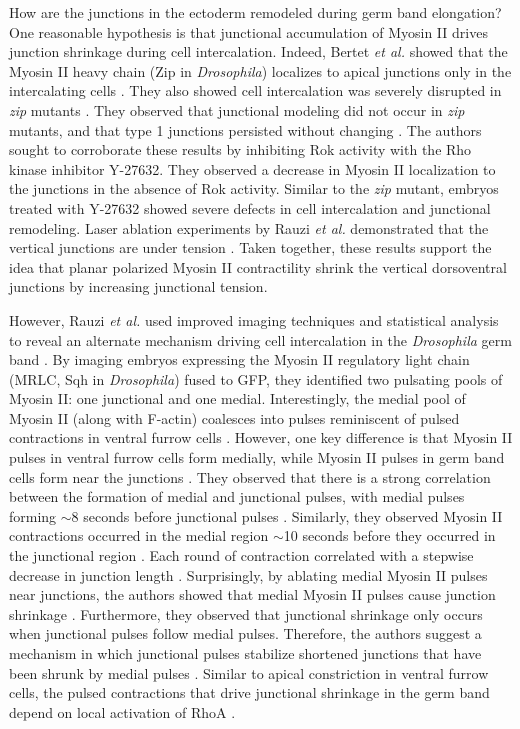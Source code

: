 \documentclass{ucetd}
\begin{document}
How are the junctions in the ectoderm remodeled during germ band elongation?  One reasonable hypothesis is that junctional accumulation of Myosin II drives junction shrinkage during cell intercalation.  Indeed, Bertet \textit{et al.} showed that the Myosin II heavy chain (Zip in \textit{Drosophila}) localizes to apical junctions only in the intercalating cells \cite{Bertet:2004ch}.  They also showed cell intercalation was severely disrupted in \textit{zip} mutants \cite{Bertet:2004ch}.  They observed that junctional modeling did not occur in \textit{zip} mutants, and that type 1 junctions persisted without changing  \cite{Bertet:2004ch}.  The authors sought to corroborate these results by inhibiting Rok activity with the Rho kinase inhibitor Y-27632.  They observed a decrease in Myosin II localization to the junctions in the absence of Rok activity.  Similar to the \textit{zip} mutant, embryos treated with Y-27632 showed severe defects in cell intercalation and junctional remodeling.  Laser ablation experiments by Rauzi \textit{et al.} demonstrated that the vertical junctions are under tension \cite{Rauzi:2008gz}.  Taken together, these results support the idea that planar polarized Myosin II contractility shrink the vertical dorsoventral junctions by increasing junctional tension.

However, Rauzi \textit{et al.} used improved imaging techniques and statistical analysis to reveal an alternate mechanism driving cell intercalation in the \textit{Drosophila} germ band \cite{Rauzi:2010fs}.  By imaging embryos expressing the Myosin II regulatory light chain (MRLC, Sqh in \textit{Drosophila}) fused to GFP, they identified two pulsating pools of Myosin II: one junctional and one medial.  Interestingly, the medial pool of Myosin II (along with F-actin) coalesces into pulses reminiscent of pulsed contractions in ventral furrow cells \cite{Martin:2009du}.  However, one key difference is that Myosin II pulses in ventral furrow cells form medially, while Myosin II pulses in germ band cells form near the junctions \cite{Martin:2009du, Rauzi:2010fs}.  They observed that there is a strong correlation between the formation of medial and junctional pulses, with medial pulses forming $\sim$8 seconds before junctional pulses \cite{Rauzi:2010fs}.  Similarly, they observed Myosin II contractions occurred in the medial region $\sim$10 seconds before they occurred in the junctional region \cite{Rauzi:2010fs}.  Each round of contraction correlated with a stepwise decrease in junction length \cite{Rauzi:2010fs}.  Surprisingly, by ablating medial Myosin II pulses near junctions, the authors showed that medial Myosin II pulses cause junction shrinkage \cite{Rauzi:2010fs}.  Furthermore, they observed that junctional shrinkage only occurs when junctional pulses follow medial pulses.  Therefore, the authors suggest a mechanism in which junctional pulses stabilize shortened junctions that have been shrunk by medial pulses \cite{Rauzi:2010fs}.  Similar to apical constriction in ventral furrow cells, the pulsed contractions that drive junctional shrinkage in the germ band depend on local activation of RhoA \cite{Mason:2013ee, Munjal:2015bx}.
\end{document}
